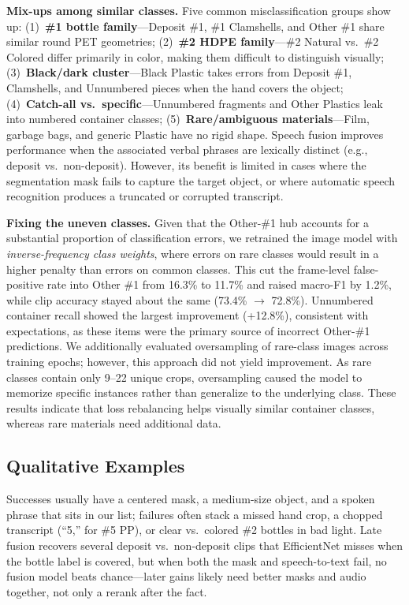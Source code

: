 \documentclass[conference]{IEEEtran}
\begin{document}
\textbf{Mix-ups among similar classes.}
Five common misclassification groups show up:
(1)~\textbf{\#1 bottle family}---Deposit \#1, \#1 Clamshells, and Other \#1 share similar round PET geometries;
(2)~\textbf{\#2 HDPE family}---\#2 Natural vs.\ \#2 Colored differ primarily in color, making them difficult to distinguish visually;
(3)~\textbf{Black/dark cluster}---Black Plastic takes errors from Deposit \#1, Clamshells, and Unnumbered pieces when the hand covers the object;
(4)~\textbf{Catch-all vs.\ specific}---Unnumbered fragments and Other Plastics leak into numbered container classes;
(5)~\textbf{Rare/ambiguous materials}---Film, garbage bags, and generic Plastic have no rigid shape.
Speech fusion improves performance when the associated verbal phrases are lexically distinct (e.g., deposit vs.\ non-deposit). However, its benefit is limited in cases where the segmentation mask fails to capture the target object, or where automatic speech recognition produces a truncated or corrupted transcript.


\textbf{Fixing the uneven classes.}
Given that the Other-\#1 hub accounts for a substantial proportion of classification errors, we retrained the image model with \emph{inverse-frequency class weights}, where errors on rare classes would result in a higher penalty than errors on common classes.
This cut the frame-level false-positive rate into Other \#1 from 16.3\% to 11.7\% and raised macro-F1 by 1.2\%, while clip accuracy stayed about the same (73.4\% $\rightarrow$ 72.8\%).
Unnumbered container recall showed the largest improvement (+12.8\%), consistent with expectations, as these items were the primary source of incorrect Other-\#1 predictions.
We additionally evaluated oversampling of rare-class images across training epochs; however, this approach did not yield improvement. As rare classes contain only 9--22 unique crops, oversampling caused the model to memorize specific instances rather than generalize to the underlying class.
These results indicate that loss rebalancing helps visually similar container classes, whereas rare materials need additional data.

\subsection{Qualitative Examples}
Successes usually have a centered mask, a medium-size object, and a spoken phrase that sits in our list; failures often stack a missed hand crop, a chopped transcript (``5,'' for \#5 PP), or clear vs.\ colored \#2 bottles in bad light.
Late fusion recovers several deposit vs.\ non-deposit clips that EfficientNet misses when the bottle label is covered, but when both the mask and speech-to-text fail, no fusion model beats chance---later gains likely need better masks and audio together, not only a rerank after the fact.
\end{document}

